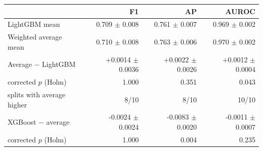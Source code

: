 \begin{tabular}{lrrr}
\toprule
 & F1 & AP & AUROC \\
\midrule
LightGBM mean & 0.709 $\pm$ 0.008 & 0.761 $\pm$ 0.007 & 0.969 $\pm$ 0.002 \\
Weighted average mean & 0.710 $\pm$ 0.008 & 0.763 $\pm$ 0.006 & 0.970 $\pm$ 0.002 \\
Average $-$ LightGBM & +0.0014 $\pm$ 0.0036 & +0.0022 $\pm$ 0.0026 & +0.0012 $\pm$ 0.0004 \\
\quad corrected $p$ (Holm) & 1.000 & 0.351 & 0.043 \\
\quad splits with average higher & 8/10 & 8/10 & 10/10 \\
XGBoost $-$ average & -0.0024 $\pm$ 0.0024 & -0.0083 $\pm$ 0.0020 & -0.0011 $\pm$ 0.0007 \\
\quad corrected $p$ (Holm)  & 1.000 & 0.004 & 0.235 \\
\bottomrule
\end{tabular}
